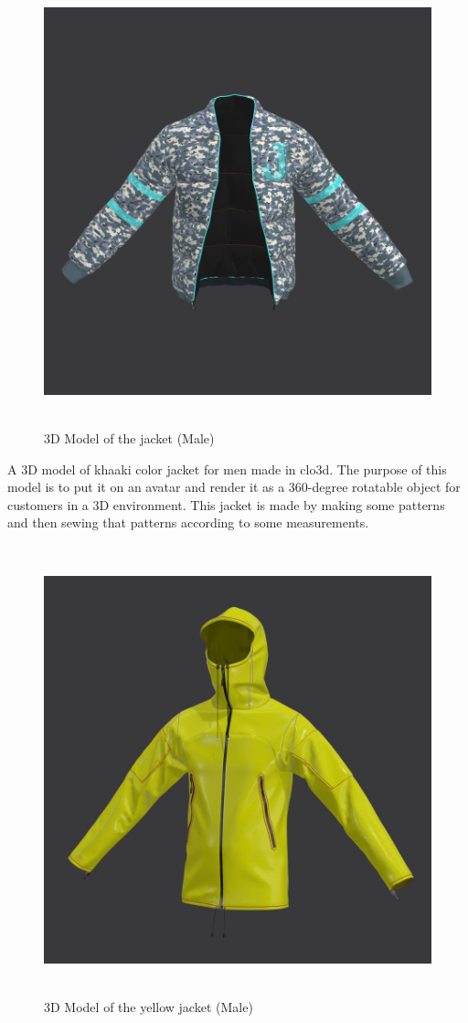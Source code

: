 \begin{figure}[H]
    \centering
    \includegraphics[width=13cm,height=13cm]{Figures/3DJackets/male2.png}
    \caption{3D Model of the jacket (Male)}
    \label{fig2:3D Model of the jacket (Male)}

\end{figure}
\justifying
A 3D model of khaaki color jacket for men made in clo3d. The purpose of this model is to put it on an avatar and render it as a 360-degree rotatable object for customers in a 3D environment. This jacket is made by making some patterns and then sewing that patterns according to some measurements.
\begin{figure}[H]
    \centering
    \includegraphics[width=13cm,height=13cm]{Figures/3DJackets/male3.png}
    \caption{3D Model of the yellow jacket (Male)}
    \label{fig3:3D Model of the yellow jacket (Male)}
\end{figure}
